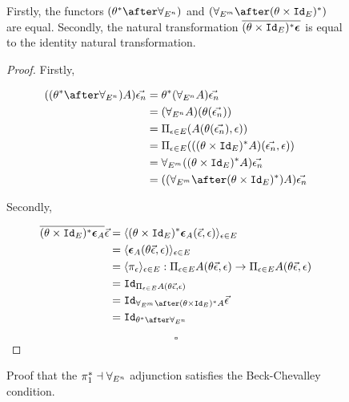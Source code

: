 \documentclass{Report}
\begin{document}
\begin{figure}
    \begin{framed}
        
\begin{theorem}
    Firstly, the functors $(\theta\star\after\allEn)$ and $(\allEm\after(\theta\times\Id{E})\star)$ are equal. Secondly, the natural transformation $\overline{(\theta\times\texttt{Id}_{E})^* \boldsymbol{\epsilon}_{}}$ is equal to the identity natural transformation.
\end{theorem}

    \begin{proof}

        Firstly,

    \begin{align*}
    ((\theta\star\after\allEn)A)\env &= \theta\star(\allEn  A)\env\\
        &= (\allEn A)(\theta(\env))\\
        &= \Pi_{\e\in E}(A(\theta(\env), \e))\\
    &= \Pi_{\e\in E}(((\theta\times \Id{E})\star A)(\env,   \e))\\
        &= \allEm((\theta\times\Id{E})\star A)\env\\
        &= ((\allEm\after(\theta\times\Id{E})\star)A)\env
    \end{align*}

Secondly,
    
\begin{align*}
    \bar{(\theta\times\Id{E})\star \counit{A}} \ev  & = \finpr{(\theta\times\Id{E})\star\counit{A}(\ev, \e)}{\e\in E}\\
    & = \finpr{\counit{A}(\theta\ev, \e)}{\e\in E}\\
    & = \finpr{\pi_\e}{\e\in E}: \Pi_{\e\in E}A(\theta\ev, \e) \rightarrow \Pi_{\e\in E}A(\theta\ev, \e)\\
    & = \Id{\Pi_{\e\in E}A(\theta\ev, \e)}\\
    & = \Id{\allEm\after(\theta\times\Id{E})\star A}\ev\\
    & = \Id{\theta\star\after\allEn}
\end{align*}

    $$\square$$
    \end{proof}
    \end{framed}
    \caption{Proof that the $\pi_1^* \dashv \forall_{E^n}$ adjunction satisfies the Beck-Chevalley condition.}
    \label{BeckChevalley1}
\end{figure}
\end{document}
